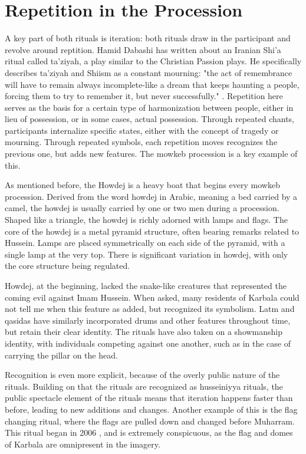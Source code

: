 \section{Repetition in the Procession}
A key part of both rituals is iteration: both rituals draw in the participant and revolve around reptition. Hamid Dabashi has written about an Iranian Shi'a ritual called ta'ziyah, a play similar to the Christian Passion plays. He specifically describes ta'ziyah and Shiism as a constant mourning: "the act of remembrance will have to remain always incomplete-like a dream that keeps haunting a people, forcing them to try to remember it, but never successfully." \cite{dabashi_taziyeh_2005}. Repetition here serves as the basis for a certain type of harmonization between people, either in lieu of possession, or in some cases, actual possession. Through repeated chants, participants internalize specific states, either with the concept of tragedy or mourning. Through repeated symbols, each repetition moves recognizes the previous one, but adds new features. The mowkeb procession is a key example of this.

As mentioned before, the Howdej is a heavy boat that begins every mowkeb procession. Derived from the word howdej in Arabic, meaning a bed carried by a camel, the howdej is usually carried by one or two men during a procession. Shaped like a triangle, the howdej is richly adorned with lamps and flags. The core of the howdej is a metal pyramid structure, often bearing remarks related to Hussein. Lamps are placed symmetrically on each side of the pyramid, with a single lamp at the very top. There is significant variation in howdej, with only the core structure being regulated. 

Howdej, at the beginning, lacked the snake-like creatures that represented the coming evil against Imam Hussein. When asked, many residents of Karbala could not tell me when this feature as added, but recognized its symbolism. Latm and qasidas have similarly incorporated drums and other features throughout time, but retain their clear identity. The rituals have also taken on a showmanship identity, with individuals competing against one another, such as in the case of carrying the pillar on the head. 

Recognition is even more explicit, because of the overly public nature of the rituals. Building on that the rituals are recognized as husseiniyya rituals, the public spectacle element of the rituals means that iteration happens faster than before, leading to new additions and changes. Another example of this is the flag changing ritual, where the flags are pulled down and changed before Muharram. This ritual began in 2006 \cite{hamdan_development_2012}, and is extremely conspicuous, as the flag and domes of Karbala are omnipresent in the imagery. 

